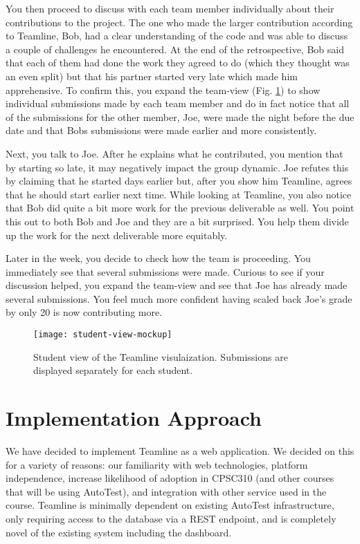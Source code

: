 \documentclass[preprint,journal]{vgtc}       %
\begin{document}
You then proceed to discuss with each team member individually about their contributions
to the project. The one who made the larger contribution according to Teamline, Bob,
had a clear understanding of the code and was able to discuss a couple of challenges
he encountered. At the end of the retrospective, Bob said that each of them had
done the work they agreed to do (which they thought was an even split) but that
his partner started very late which made him apprehensive.
To confirm this, you expand the team-view (Fig. \ref{fig:studentview}) to show individual submissions made by
each team member and do in fact notice that all of the submissions for the other
member, Joe, were made the night before the due date and that Bobs submissions were
made earlier and more consistently.

Next, you talk to Joe. After he explains what he contributed, you mention that by
starting so late, it may negatively impact the group dynamic. Joe refutes this by claiming
that he started days earlier but, after you show him Teamline, agrees that he should
start earlier next time. While looking at Teamline, you also notice that Bob did
quite a bit more work for the previous deliverable as well. You point this out to
both Bob and Joe and they are a bit surprised. You help them divide up the work
for the next deliverable more equitably.

Later in the week, you decide to check how the team is proceeding. You immediately
see that several submissions were made. Curious to see if your discussion helped,
you expand the team-view and see that Joe has already made several submissions.
You feel much more confident having scaled back Joe's grade by only 20%
is now contributing more.

\begin{figure}[h]
  \centering
  \texttt{[image: student-view-mockup]}
  \caption{Student view of the Teamline visulaization. Submissions are displayed
   separately for each student.}
  \label{fig:studentview}
\end{figure}


\section{Implementation Approach}
We have decided to implement Teamline as a web application. We decided on this for
a variety of reasons: our familiarity with web technologies, platform independence,
increase likelihood of adoption in CPSC310 (and other courses that will be using AutoTest),
and integration with other service used in the course. Teamline is minimally dependent
on existing AutoTest infrastructure, only requiring access to the database via a
REST endpoint, and is completely novel of the existing system including the dashboard.
\end{document}
